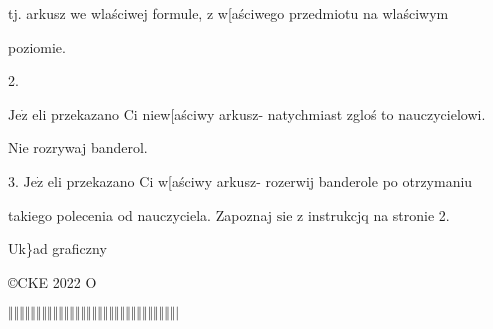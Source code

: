 \documentclass[a4paper,12pt]{article}
\begin{document}
tj. arkusz we wlaściwej formule, z w[aściwego przedmiotu na wlaściwym

poziomie.

2.

$\mathrm{J}\mathrm{e}\dot{\mathrm{z}}$ eli przekazano Ci niew[aściwy arkusz- natychmiast zgloś to nauczycielowi.

Nie rozrywaj banderol.

3. $\mathrm{J}\mathrm{e}\dot{\mathrm{z}}$ eli przekazano Ci w[aściwy arkusz- rozerwij banderole po otrzymaniu

takiego polecenia od nauczyciela. Zapoznaj $\mathrm{s}\mathrm{i}\mathrm{e}$ z instrukcjq na stronie 2.

Uk\}ad graficzny

\copyright CKE 2022 O

$\Vert\Vert\Vert\Vert\Vert\Vert\Vert\Vert\Vert\Vert\Vert\Vert\Vert\Vert\Vert\Vert\Vert\Vert\Vert\Vert\Vert\Vert\Vert\Vert\Vert\Vert\Vert\Vert\Vert\Vert|$
\end{document}
